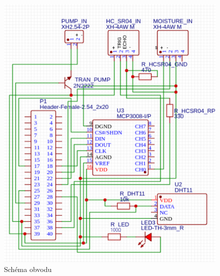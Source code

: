\documentclass[czech,12pt,a4paper]{article}
\begin{document}
\vspace*{2cm}
\begin{figure}[h]
	\begin{minipage}[t]{0.5\linewidth}
		\includegraphics[width=\linewidth]{pcb-schema.png}
		\caption{Schéma obvodu}
		\label{fig:schema-obvodu}
	\end{minipage}
	\hfill
	\begin{minipage}[t]{0.5\linewidth}

\end{minipage}
\end{figure}
\end{document}

